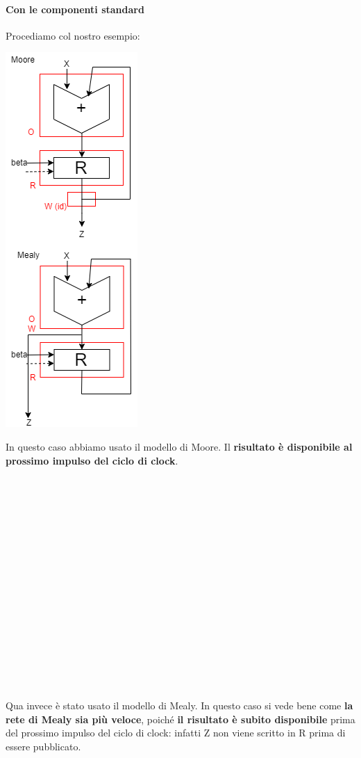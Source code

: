 \documentclass[10pt]{report}
\begin{document}
\paragraph{Con le componenti standard} Procediamo col nostro esempio:\\
\begin{multicols}{2}
\begin{center}
\includegraphics[scale=0.8]{esempiocompstd.png}
\end{center}
\columnbreak

In questo caso abbiamo usato il modello di Moore. Il \textbf{risultato è disponibile al prossimo impulso del ciclo di clock}.\\\\\\\\\\\\\\\\\\\\\\\\\\\\\\\\\\\\

Qua invece è stato usato il modello di Mealy. In questo caso si vede bene come \textbf{la rete di Mealy sia più veloce}, poiché \textbf{il risultato è subito disponibile} prima del prossimo impulso del ciclo di clock: infatti Z non viene scritto in R prima di essere pubblicato.
\end{multicols}
\end{document}
